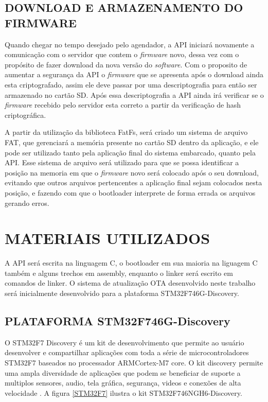 \subsection{DOWNLOAD E ARMAZENAMENTO DO FIRMWARE}

Quando chegar no tempo desejado pelo agendador, a API iniciará novamente a comunicação com o servidor que contem o \textit{firmware} novo, dessa vez com o propósito de fazer download da nova versão do \textit{software}. Com o proposito de aumentar a segurança da API o \textit{firmware} que se apresenta após o download ainda esta criptografado, assim ele deve passar por uma descriptografia para então ser armazenado no cartão SD. Após essa descriptografia a API ainda irá verificar se o \textit{firmware} recebido pelo servidor esta correto a partir da verificação de hash criptográfica. 

A partir da utilização da biblioteca FatFs, será criado um sistema de arquivo FAT, que gerenciará a memória presente no cartão SD dentro da aplicação, e ele pode ser utilizado tanto pela aplicação final do sistema embarcado, quanto pela API. Esse sistema de arquivo será utilizado para que se possa identificar a posição na memoria em que o \textit{firmware} novo será colocado após o seu download, evitando que outros arquivos pertencentes a aplicação final sejam colocados nesta posição, e fazendo com que o bootloader interprete de forma errada os arquivos gerando erros.

\section{MATERIAIS UTILIZADOS}

A API será escrita na linguagem C, o bootloader em sua maioria na liguagem C também e alguns trechos em assembly, enquanto o linker será escrito em comandos de linker. O sistema de atualização OTA desenvolvido neste trabalho será inicialmente desenvolvido para a plataforma STM32F746G-Discovery.

\subsection{PLATAFORMA STM32F746G-Discovery}

O STM32F7 Discovery é um kit de desenvolvimento que permite ao usuário desenvolver e compartilhar aplicações com toda a série de microcontroladores STM32F7 baseados no processador ARM\textregistered  Cortex\textregistered-M7 core.
O kit discovery permite uma ampla diversidade de aplicações que podem se beneficiar de suporte a multiplos sensores, audio, tela gráfica, segurança, videos e conexões de alta velocidade \cite{STM32F7}.
A figura \ref{STM32F7} ilustra o kit STM32F746NGH6-Discovery.

